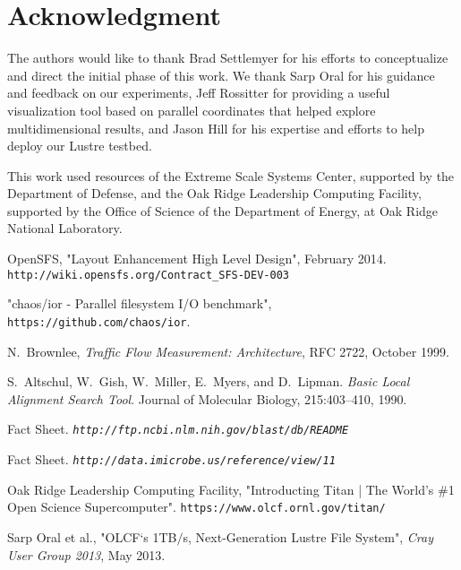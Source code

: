 \documentclass[conference,compsoc]{IEEEtran}
\begin{document}
\section*{Acknowledgment}
\fi

The authors would like to thank Brad Settlemyer for his efforts to conceptualize and direct the initial phase of this work. 
We thank Sarp Oral for his guidance and feedback on our experiments, Jeff Rossitter for providing a useful visualization tool based on parallel coordinates that helped explore multidimensional results, and Jason Hill for his expertise and efforts to help deploy our Lustre testbed.

This work used resources of the Extreme Scale Systems Center, supported 
by the Department of Defense, and the Oak Ridge Leadership Computing 
Facility, supported by the Office of Science of the Department of 
Energy, at Oak Ridge National Laboratory.





\begin{thebibliography}{1}

OpenSFS, "Layout Enhancement High Level Design", February 2014. \texttt{http://wiki.opensfs.org/Contract\_SFS-DEV-003}

"chaos/ior - Parallel filesystem I/O benchmark", \texttt{https://github.com/chaos/ior}.

N.~Brownlee, \emph{Traffic Flow Measurement: Architecture}, RFC 2722, October 1999.

S.~Altschul, W.~Gish, W.~Miller, E.~Myers, and D.~Lipman. \emph{Basic Local Alignment Search Tool}.
Journal of Molecular Biology, 215:403–410, 1990.

Fact Sheet. \emph{\texttt{http://ftp.ncbi.nlm.nih.gov/blast/db/README}}

Fact Sheet. \emph{\texttt{http://data.imicrobe.us/reference/view/11}}

Oak Ridge Leadership Computing Facility, "Introducting Titan | The World's \#1 Open Science Supercomputer". \texttt{https://www.olcf.ornl.gov/titan/}

Sarp Oral et al., "OLCF`s 1TB$/$s, Next-Generation Lustre File System", \emph{Cray User Group 2013}, May 2013.



\end{thebibliography}
\end{document}
